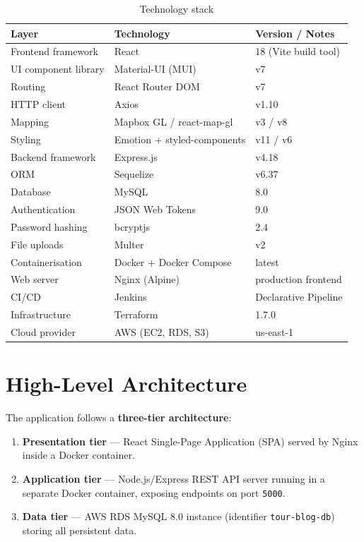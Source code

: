 \documentclass[12pt,a4paper]{report}
\begin{document}
\begin{table}[H]
  \centering
  \caption{Technology stack}
  \label{tab:stack}
  \begin{tabular}{lll}
    \toprule
    \textbf{Layer} & \textbf{Technology} & \textbf{Version / Notes} \\
    \midrule
    Frontend framework    & React                & 18 (Vite build tool) \\
    UI component library  & Material-UI (MUI)    & v7 \\
    Routing               & React Router DOM     & v7 \\
    HTTP client           & Axios                & v1.10 \\
    Mapping               & Mapbox GL / react-map-gl & v3 / v8 \\
    Styling               & Emotion + styled-components & v11 / v6 \\
    Backend framework     & Express.js           & v4.18 \\
    ORM                   & Sequelize            & v6.37 \\
    Database              & MySQL                & 8.0 \\
    Authentication        & JSON Web Tokens      & 9.0 \\
    Password hashing      & bcryptjs             & 2.4 \\
    File uploads          & Multer               & v2 \\
    Containerisation      & Docker + Docker Compose & latest \\
    Web server            & Nginx (Alpine)       & production frontend \\
    CI/CD                 & Jenkins              & Declarative Pipeline \\
    Infrastructure        & Terraform            & 1.7.0 \\
    Cloud provider        & AWS (EC2, RDS, S3)   & us-east-1 \\
    \bottomrule
  \end{tabular}
\end{table}

\section{High-Level Architecture}

The application follows a \textbf{three-tier architecture}:

\begin{enumerate}[leftmargin=2em]
  \item \textbf{Presentation tier} — React Single-Page Application (SPA) served by Nginx inside a Docker container.
  \item \textbf{Application tier} — Node.js/Express REST API server running in a separate Docker container, exposing endpoints on port \texttt{5000}.
  \item \textbf{Data tier} — AWS RDS MySQL 8.0 instance (identifier \texttt{tour-blog-db}) storing all persistent data.
\end{enumerate}
\end{document}
